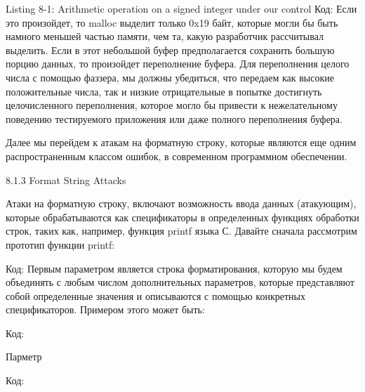 \documentclass[12pt, a4paper, oneside]{book}
\begin{document}
Listing 8-1: Arithmetic operation on a signed integer under our control
Код:
Если это произойдет, то malloc выделит только 0x19 байт, которые могли бы быть намного меньшей частью памяти, чем та, какую разработчик рассчитывал выделить. Если в этот небольшой буфер предполагается сохранить большую порцию данных, то произойдет переполнение буфера. Для переполнения целого числа с помощью фаззера, мы должны убедиться, что передаем как высокие положительные числа, так и низкие отрицательные в попытке достигнуть целочисленного переполнения, которое могло бы привести к нежелательному поведению тестируемого приложения или даже полного переполнения буфера.

Далее мы перейдем к атакам на форматную строку, которые являются еще одним распространенным классом ошибок, в современном программном обеспечении.

8.1.3 Format String Attacks

Атаки на форматную строку, включают возможность ввода данных (атакующим), которые обрабатываются как спецификаторы в определенных функциях обработки строк, таких как, например, функция printf языка С. Давайте сначала рассмотрим прототип функции printf:

Код:
Первым параметром является строка форматирования, которую мы будем объединять с любым числом дополнительных параметров, которые представляют собой определенные значения и описываются с помощью конкретных спецификаторов. Примером этого может быть:

Код:

Парметр %

Код:
\end{document}
